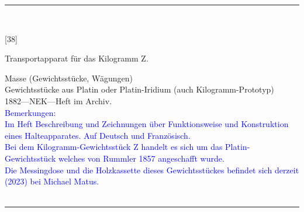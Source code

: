 \parbox{\textwidth}{%
\rule{\textwidth}{1pt}\vspace*{-3mm}\\
\begin{minipage}[t]{0.15\textwidth}\vspace{0pt}
\Huge\rule[-4mm]{0cm}{1cm}[38]
\end{minipage}
\hfill
\begin{minipage}[t]{0.85\textwidth}\vspace{0pt}
\large Transportapparat für das Kilogramm {\glqq}Z{\grqq}.\rule[-2mm]{0mm}{2mm}
\end{minipage}
{\footnotesize\flushright
Masse (Gewichtsstücke, Wägungen)\\
Gewichtsstücke aus Platin oder Platin-Iridium (auch Kilogramm-Prototyp)\\
}
1882\quad---\quad NEK\quad---\quad Heft im Archiv.\\
\textcolor{blue}{Bemerkungen:\\{}
Im Heft Beschreibung und Zeichnungen über Funktionsweise und Konstruktion eines Halteapparates. Auf Deutsch und Französisch.\\{}
Bei dem Kilogramm-Gewichtsstück {\glqq}Z{\grqq} handelt es sich um das Platin-Gewichtsstück welches von Rummler 1857 angeschafft wurde.\\{}
Die Messingdose und die Holzkassette dieses Gewichtsstückes befindet sich derzeit (2023) bei Michael Matus.\\{}
}
\\[-15pt]
\rule{\textwidth}{1pt}
}
\\
\vspace*{-2.5pt}\\

